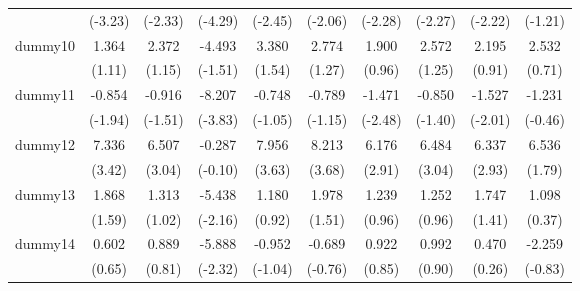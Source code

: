{\begin{tabular}{l*{9}{c}}
            &     (-3.23)         &     (-2.33)         &     (-4.29)         &     (-2.45)         &     (-2.06)         &     (-2.28)         &     (-2.27)         &     (-2.22)         &     (-1.21)         \\
[1em]
dummy10     &       1.364         &       2.372         &      -4.493         &       3.380         &       2.774         &       1.900         &       2.572         &       2.195         &       2.532         \\
            &      (1.11)         &      (1.15)         &     (-1.51)         &      (1.54)         &      (1.27)         &      (0.96)         &      (1.25)         &      (0.91)         &      (0.71)         \\
[1em]
dummy11     &      -0.854         &      -0.916         &      -8.207\sym{***}&      -0.748         &      -0.789         &      -1.471\sym{*}  &      -0.850         &      -1.527\sym{*}  &      -1.231         \\
            &     (-1.94)         &     (-1.51)         &     (-3.83)         &     (-1.05)         &     (-1.15)         &     (-2.48)         &     (-1.40)         &     (-2.01)         &     (-0.46)         \\
[1em]
dummy12     &       7.336\sym{***}&       6.507\sym{**} &      -0.287         &       7.956\sym{***}&       8.213\sym{***}&       6.176\sym{**} &       6.484\sym{**} &       6.337\sym{**} &       6.536         \\
            &      (3.42)         &      (3.04)         &     (-0.10)         &      (3.63)         &      (3.68)         &      (2.91)         &      (3.04)         &      (2.93)         &      (1.79)         \\
[1em]
dummy13     &       1.868         &       1.313         &      -5.438\sym{*}  &       1.180         &       1.978         &       1.239         &       1.252         &       1.747         &       1.098         \\
            &      (1.59)         &      (1.02)         &     (-2.16)         &      (0.92)         &      (1.51)         &      (0.96)         &      (0.96)         &      (1.41)         &      (0.37)         \\
[1em]
dummy14     &       0.602         &       0.889         &      -5.888\sym{*}  &      -0.952         &      -0.689         &       0.922         &       0.992         &       0.470         &      -2.259         \\
            &      (0.65)         &      (0.81)         &     (-2.32)         &     (-1.04)         &     (-0.76)         &      (0.85)         &      (0.90)         &      (0.26)         &     (-0.83)         \\

\end{tabular}}
